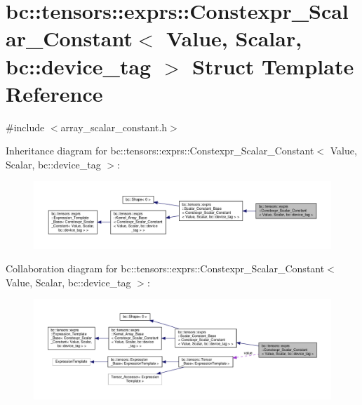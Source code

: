 \hypertarget{structbc_1_1tensors_1_1exprs_1_1Constexpr__Scalar__Constant_3_01Value_00_01Scalar_00_01bc_1_1device__tag_01_4}{}\section{bc\+:\+:tensors\+:\+:exprs\+:\+:Constexpr\+\_\+\+Scalar\+\_\+\+Constant$<$ Value, Scalar, bc\+:\+:device\+\_\+tag $>$ Struct Template Reference}
\label{structbc_1_1tensors_1_1exprs_1_1Constexpr__Scalar__Constant_3_01Value_00_01Scalar_00_01bc_1_1device__tag_01_4}


{\ttfamily \#include $<$array\+\_\+scalar\+\_\+constant.\+h$>$}



Inheritance diagram for bc\+:\+:tensors\+:\+:exprs\+:\+:Constexpr\+\_\+\+Scalar\+\_\+\+Constant$<$ Value, Scalar, bc\+:\+:device\+\_\+tag $>$\+:\nopagebreak
\begin{figure}[H]
\begin{center}
\leavevmode
\includegraphics[width=350pt]{structbc_1_1tensors_1_1exprs_1_1Constexpr__Scalar__Constant_3_01Value_00_01Scalar_00_01bc_1_1device__tag_01_4__inherit__graph}
\end{center}
\end{figure}


Collaboration diagram for bc\+:\+:tensors\+:\+:exprs\+:\+:Constexpr\+\_\+\+Scalar\+\_\+\+Constant$<$ Value, Scalar, bc\+:\+:device\+\_\+tag $>$\+:\nopagebreak
\begin{figure}[H]
\begin{center}
\leavevmode
\includegraphics[width=350pt]{structbc_1_1tensors_1_1exprs_1_1Constexpr__Scalar__Constant_3_01Value_00_01Scalar_00_01bc_1_1device__tag_01_4__coll__graph}
\end{center}
\end{figure}
